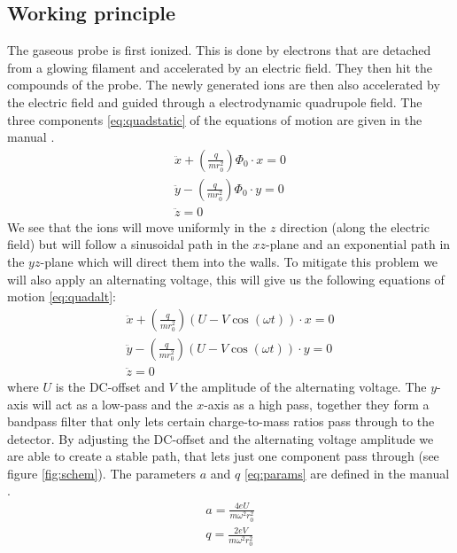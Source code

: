 \subsection{Working principle}
    The gaseous probe is first ionized. This is done by electrons that are detached from a glowing filament and accelerated by an electric field. They then hit the compounds of the probe.  The newly generated ions are then also accelerated by the electric field and guided through a electrodynamic quadrupole field. The three components \eqref{eq:quadstatic} of the equations of motion are given in the manual \cite{manual}.
    \begin{equation}
        \begin{aligned}
            \ddot x + \left(\frac{q}{mr_0^2}\right)\Phi_0\cdot x= 0 \\
            \ddot y - \left(\frac{q}{mr_0^2}\right)\Phi_0\cdot y= 0 \\
            \ddot z = 0 
            \label{eq:quadstatic}
        \end{aligned}
    \end{equation}
    We see that the ions will move uniformly in the $z$ direction (along the electric field) but will follow a sinusoidal path in the $xz$-plane and an exponential path in the $yz$-plane which will direct them into the walls. To mitigate this problem we will also apply an alternating voltage, this will give us the following equations of motion \eqref{eq:quadalt}:
    \begin{equation}
        \begin{aligned}
            \ddot x + \left(\frac{q}{mr_0^2}\right)(U-V\cos(\omega t))\cdot x= 0 \\
            \ddot y - \left(\frac{q}{mr_0^2}\right)(U-V\cos(\omega t))\cdot y= 0 \\
            \ddot z = 0 
            \label{eq:quadalt}
        \end{aligned}
    \end{equation}
    where $U$ is the DC-offset and $V$ the amplitude of the alternating voltage.
    The $y$-axis will act as a low-pass and the $x$-axis as a high pass, together they form a bandpass filter that only lets certain charge-to-mass ratios pass through to the detector. By adjusting the DC-offset and the alternating voltage amplitude we are able to create a stable path, that lets just one component pass through (see figure \ref{fig:schem}). The parameters $a$ and $q$ \eqref{eq:params} are defined in the manual \cite{manual}.
    \begin{equation}
        \begin{aligned}
            a = \frac{4eU}{m\omega^2r_0^2} \\
            q = \frac{2eV}{m\omega^2r_0^2}
            \label{eq:params}
        \end{aligned}
    \end{equation}
